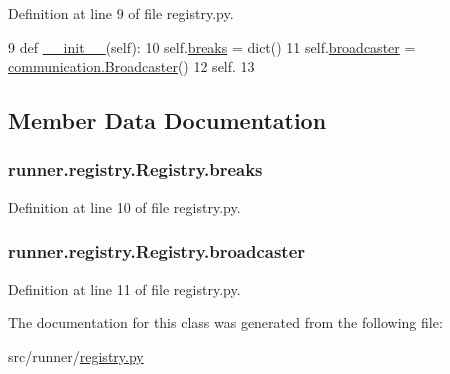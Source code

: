 Definition at line 9 of file registry.\+py.


\begin{DoxyCode}
9     \textcolor{keyword}{def }\hyperlink{classrunner_1_1registry_1_1Registry_aa969d7ebc295f86087fc02955242b883}{\_\_init\_\_}(self):
10         self.\hyperlink{classrunner_1_1registry_1_1Registry_aea21eca3b45606ba3126bc9580d1db58}{breaks} = dict()
11         self.\hyperlink{classrunner_1_1registry_1_1Registry_a8151db54dfe15fa4e55584f5113ae80c}{broadcaster} = \hyperlink{classrunner_1_1communication_1_1Broadcaster}{communication.Broadcaster}()
12         self.
13 \end{DoxyCode}


\subsection{Member Data Documentation}
\hypertarget{classrunner_1_1registry_1_1Registry_aea21eca3b45606ba3126bc9580d1db58}{}
\subsubsection[{breaks}]{\setlength{\rightskip}{0pt plus 5cm}runner.\+registry.\+Registry.\+breaks}\label{classrunner_1_1registry_1_1Registry_aea21eca3b45606ba3126bc9580d1db58}


Definition at line 10 of file registry.\+py.

\hypertarget{classrunner_1_1registry_1_1Registry_a8151db54dfe15fa4e55584f5113ae80c}{}
\subsubsection[{broadcaster}]{\setlength{\rightskip}{0pt plus 5cm}runner.\+registry.\+Registry.\+broadcaster}\label{classrunner_1_1registry_1_1Registry_a8151db54dfe15fa4e55584f5113ae80c}


Definition at line 11 of file registry.\+py.



The documentation for this class was generated from the following file\+:\begin{DoxyCompactItemize}
\item 
src/runner/\hyperlink{registry_8py}{registry.\+py}\end{DoxyCompactItemize}
